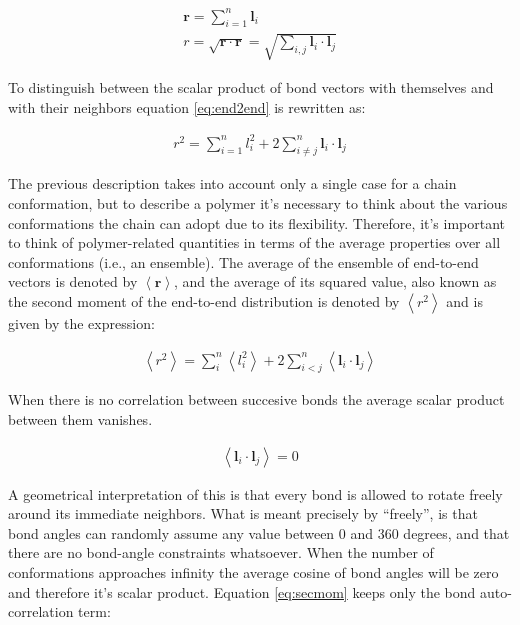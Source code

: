 \begin{gather}
\label{eq:e2e}
\mathbf{r} = \sum_{i=1}^{n} \mathbf{l}_{i}\\
\label{eq:end2end}
r = \sqrt{\mathbf{r} \cdot \mathbf{r}}
  = \sqrt{\sum_{i,j}\mathbf{l}_{i} \cdot \mathbf{l}_{j}}
\end{gather}

To distinguish between the scalar product of bond vectors with
themselves and with their neighbors equation \ref{eq:end2end} is
rewritten as:

\begin{gather}
r^2 = \sum_{i=1}^{n}l_{i}^{2} + 2 \sum_{i\neq j}^{n}
\mathbf{l}_{i} \cdot \mathbf{l}_{j}
\end{gather}  

The previous description takes into account only a single case for a chain
conformation, but to describe a  polymer it's necessary to think about
the   various  conformations   the  chain   can  adopt   due   to  its
flexibility. Therefore,  it's  important to think  of polymer-related
quantities   in   terms   of   the   average   properties   over   all
conformations (i.e.,  an ensemble). The  average of the ensemble  of 
end-to-end vectors  is denoted by $\left< \mathbf{r}  \right>$, and the
average of its  squared value, also known as the  second moment of the
end-to-end  distribution is denoted  by $\left<  r^2 \right>$  and is
given by the expression:

\begin{gather}
\label{eq:secmom}  
\left<r^2\right>=\sum_{i}^{n}\left<l_{i}^2\right> +
2\sum_{i<j}^{n}\left<\mathbf{l}_{i} \cdot \mathbf{l}_{j}\right>
\end{gather}  

When there is no correlation between succesive bonds the average
scalar product between them vanishes.

\begin{gather}
\label{eq:nocorr}
\left<\mathbf{l}_{i} \cdot \mathbf{l}_{j}\right> = 0
\end{gather}

A geometrical interpretation of this  is that every bond is allowed to
rotate freely around its immediate neighbors.  What is meant precisely
by  ``freely'', is  that bond  angles  can randomly  assume any  value
between  0  and  360  degrees,   and  that  there  are  no  bond-angle
constraints whatsoever.   When the number  of conformations approaches
infinity the average cosine of  bond angles will be zero and therefore
it's  scalar product.   Equation \ref{eq:secmom} keeps  only the
bond auto-correlation term:

